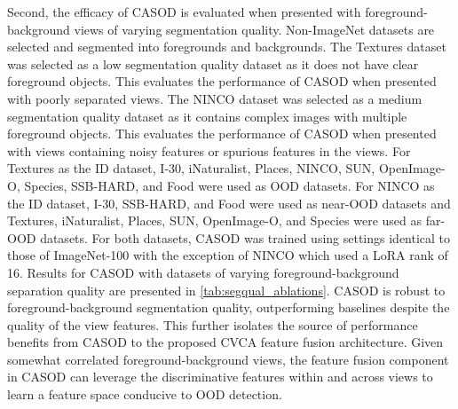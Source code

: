 Second, the efficacy of CASOD is evaluated when presented with foreground-background views of varying segmentation quality. Non-ImageNet datasets are selected and segmented into foregrounds and backgrounds. The Textures dataset was selected as a low segmentation quality dataset as it does not have clear foreground objects. This evaluates the performance of CASOD when presented with poorly separated views. The NINCO dataset was selected as a medium segmentation quality dataset as it contains complex images with multiple foreground objects. This evaluates the performance of CASOD when presented with views containing noisy features or spurious features in the views. For Textures as the ID dataset, I-30, iNaturalist, Places, NINCO, SUN, OpenImage-O, Species, SSB-HARD, and Food were used as OOD datasets. For NINCO as the ID dataset, I-30, SSB-HARD, and Food were used as near-OOD datasets and Textures, iNaturalist, Places, SUN, OpenImage-O, and Species were used as far-OOD datasets. For both datasets, CASOD was trained using settings identical to those of ImageNet-100 with the exception of NINCO which used a LoRA rank of 16. Results for CASOD with datasets of varying foreground-background separation quality are presented in \ref{tab:segqual_ablations}. CASOD is robust to foreground-background segmentation quality, outperforming baselines despite the quality of the view features. This further isolates the source of performance benefits from CASOD to the proposed CVCA feature fusion architecture. Given somewhat correlated foreground-background views, the feature fusion component in CASOD can leverage the discriminative features within and across views to learn a feature space conducive to OOD detection.

